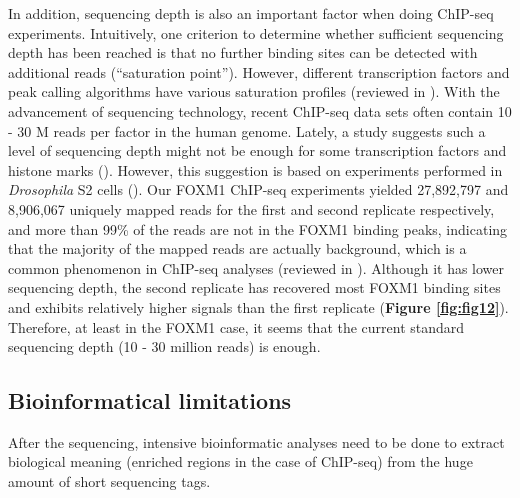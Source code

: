 In addition, sequencing depth is also an important factor when doing ChIP-seq experiments. Intuitively, one criterion to determine whether sufficient sequencing depth has been reached is that no further binding sites can be detected with additional reads (\enquote{saturation point}). However, different transcription factors and peak calling algorithms have various saturation profiles (reviewed in \cite{park2009chip-seq:}). With the advancement of sequencing technology, recent ChIP-seq data sets often contain 10 - 30 M reads per factor in the human genome. Lately, a study suggests such a level of sequencing depth might not be enough for some transcription factors and histone marks (\cite{chen2012systematic}). However, this
suggestion is based on experiments performed in \textit{Drosophila} S2 cells (\cite{chen2012systematic}). Our FOXM1 ChIP-seq experiments yielded 27,892,797 and 8,906,067 uniquely mapped reads for the first and second replicate respectively, and more than 99\% of the reads are not in the FOXM1 binding peaks, indicating that the majority of the mapped reads are actually background, which is a common phenomenon in ChIP-seq analyses (reviewed in \cite{pepke2009computation}). Although it has lower sequencing depth, the second replicate has recovered most FOXM1 binding sites and exhibits relatively higher signals than the first replicate (\textbf{Figure \ref{fig:fig12}}). Therefore, at least in the FOXM1 case, it seems that the current standard sequencing depth (10 - 30 million reads) is enough.

\subsection{Bioinformatical limitations}

After the sequencing, intensive bioinformatic analyses need to be done to extract biological meaning (enriched regions in the case of ChIP-seq) from the huge amount of short sequencing tags.

